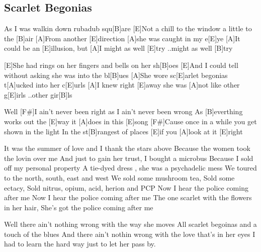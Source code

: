 \subsection*{Scarlet Begonias   }
\begin{guitar}
[E]As I was walkin down rubadub squ[B]are 
[E]Not a chill to the window a little to the [B]air 
[A]From another [E]direction [A]she was caught in my e[E]ye
[A]It could be an [E]illusion, but [A]I might as well [E]try
..might as well [B]try



[E]She had rings on her fingers and bells on her sh[B]oes 
[E]And I could tell without asking she was into the bl[B]ues 
[A]She wore sc[E]arlet begonias t[A]ucked into her c[E]urls
[A]I knew right [E]away she was [A]not like other g[E]irls
..other gir[B]ls



Well [F#]I ain't never been right as I ain't never been wrong
As [B]everthing works out the [E]way it [A]does in this [E]song
[F#]Cause once in a while you get shown in the light
In the st[B]rangest of places [E]if you [A]look at it [E]right


%
%
%
%
%
%

It was the summer of love and I thank the stars above
Because the women took the lovin over me
And just to gain her trust, I bought a microbus
Because I sold off my personal property
A tie-dyed dress , she was a psychadelic mess
We toured to the north, south, east and west
We sold some mushroom tea,
Sold some ectacy,
Sold nitrus, opium, acid, herion and PCP
Now I hear the police coming after me
Now I hear the police coming after me
The one scarlet with the flowers in her hair,
She's got the police coming after me



Well there ain't nothing wrong with the way she moves
All scarlet begoinas and a touch of the blues
And there ain't nothin wrong with the love that's in her eyes
I had to learn the hard way just to let her  pass by.

\end{guitar}
